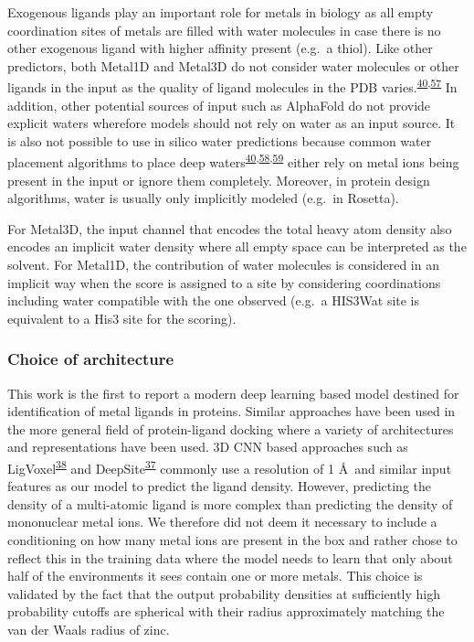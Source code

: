 \documentclass[  ASAPversion,
  ,
  9pt]{elife}
\begin{document}
Exogenous ligands play an important role for metals in biology as all empty coordination sites of metals are filled with water molecules in case there is no other exogenous ligand with higher affinity present (e.g.~a thiol). Like other predictors, both Metal1D and Metal3D do not consider water molecules or other ligands in the input as the quality of ligand molecules in the PDB varies.\textsuperscript{\protect\hyperlink{ref-9UNjBvCL}{40},\protect\hyperlink{ref-NifwNdQd}{57}} In addition, other potential sources of input such as AlphaFold do not provide explicit waters wherefore models should not rely on water as an input source. It is also not possible to use in silico water predictions because common water placement algorithms to place deep waters\textsuperscript{\protect\hyperlink{ref-9UNjBvCL}{40},\protect\hyperlink{ref-10C4imKQR}{58},\protect\hyperlink{ref-izkvZoLX}{59}} either rely on metal ions being present in the input or ignore them completely. Moreover, in protein design algorithms, water is usually only implicitly modeled (e.g.~in Rosetta).

For Metal3D, the input channel that encodes the total heavy atom density also encodes an implicit water density where all empty space can be interpreted as the solvent. For Metal1D, the contribution of water molecules is considered in an implicit way when the score is assigned to a site by considering coordinations including water compatible with the one observed (e.g.~a HIS3Wat site is equivalent to a His3 site for the scoring).

\hypertarget{choice-of-architecture}{%
\subsubsection{Choice of architecture}\label{choice-of-architecture}}

This work is the first to report a modern deep learning based model destined for identification of metal ligands in proteins. Similar approaches have been used in the more general field of protein-ligand docking where a variety of architectures and representations have been used. 3D CNN based approaches such as LigVoxel\textsuperscript{\protect\hyperlink{ref-mVGaXlum}{38}} and DeepSite\textsuperscript{\protect\hyperlink{ref-Gq7n6vhH}{37}} commonly use a resolution of 1 \AA\, and similar input features as our model to predict the ligand density. However, predicting the density of a multi-atomic ligand is more complex than predicting the density of mononuclear metal ions. We therefore did not deem it necessary to include a conditioning on how many metal ions are present in the box and rather chose to reflect this in the training data where the model needs to learn that only about half of the environments it sees contain one or more metals. This choice is validated by the fact that the output probability densities at sufficiently high probability cutoffs are spherical with their radius approximately matching the van der Waals radius of zinc.
\end{document}
